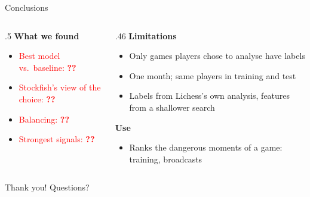 \documentclass[aspectratio=169,11pt]{beamer}
\newcommand{\hl}[1]{\textcolor{accent}{\textbf{#1}}}
\newcommand{\tbd}{\textcolor{red}{\textbf{??}}}
\begin{document}
\begin{frame}{Conclusions}
  \begin{columns}[t]
    \begin{column}{.5\textwidth}
      \hl{What we found}
      \begin{itemize}
        \item \textcolor{red}{Best model vs.\ baseline: \tbd}
        \item \textcolor{red}{Stockfish's view of the choice: \tbd}
        \item \textcolor{red}{Balancing: \tbd}
        \item \textcolor{red}{Strongest signals: \tbd}
      \end{itemize}
    \end{column}
    \begin{column}{.46\textwidth}
      \hl{Limitations}
      \begin{itemize}
        \item Only games players chose to analyse have labels
        \item One month; same players in training and test
        \item Labels from Lichess's own analysis, features from a shallower search
      \end{itemize}
      \hl{Use}
      \begin{itemize}
        \item Ranks the dangerous moments of a game: training, broadcasts
      \end{itemize}
    \end{column}
  \end{columns}
  \vspace{1em}
  \centering\large Thank you! Questions?
\end{frame}
\end{document}
